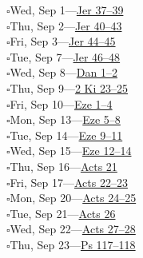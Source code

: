 \hypertarget{rp-2027-09-01}{}\noindent$\square$\enspace Wed, Sep 1\enspace---\enspace \hyperlink{ch-jeremiah-37}{Jer 37--39}\\
\hypertarget{rp-2027-09-02}{}\noindent$\square$\enspace Thu, Sep 2\enspace---\enspace \hyperlink{ch-jeremiah-40}{Jer 40--43}\\
\hypertarget{rp-2027-09-03}{}\noindent$\square$\enspace Fri, Sep 3\enspace---\enspace \hyperlink{ch-jeremiah-44}{Jer 44--45}\\
\hypertarget{rp-2027-09-07}{}\noindent$\square$\enspace Tue, Sep 7\enspace---\enspace \hyperlink{ch-jeremiah-46}{Jer 46--48}\\
\hypertarget{rp-2027-09-08}{}\noindent$\square$\enspace Wed, Sep 8\enspace---\enspace \hyperlink{ch-daniel-1}{Dan 1--2}\\
\hypertarget{rp-2027-09-09}{}\noindent$\square$\enspace Thu, Sep 9\enspace---\enspace \hyperlink{ch-2kings-23}{2 Ki 23--25}\\
\hypertarget{rp-2027-09-10}{}\noindent$\square$\enspace Fri, Sep 10\enspace---\enspace \hyperlink{ch-ezekiel-1}{Eze 1--4}\\
\hypertarget{rp-2027-09-13}{}\noindent$\square$\enspace Mon, Sep 13\enspace---\enspace \hyperlink{ch-ezekiel-5}{Eze 5--8}\\
\hypertarget{rp-2027-09-14}{}\noindent$\square$\enspace Tue, Sep 14\enspace---\enspace \hyperlink{ch-ezekiel-9}{Eze 9--11}\\
\hypertarget{rp-2027-09-15}{}\noindent$\square$\enspace Wed, Sep 15\enspace---\enspace \hyperlink{ch-ezekiel-12}{Eze 12--14}\\
\hypertarget{rp-2027-09-16}{}\noindent$\square$\enspace Thu, Sep 16\enspace---\enspace \hyperlink{ch-acts-21}{Acts 21}\\
\hypertarget{rp-2027-09-17}{}\noindent$\square$\enspace Fri, Sep 17\enspace---\enspace \hyperlink{ch-acts-22}{Acts 22--23}\\
\hypertarget{rp-2027-09-20}{}\noindent$\square$\enspace Mon, Sep 20\enspace---\enspace \hyperlink{ch-acts-24}{Acts 24--25}\\
\hypertarget{rp-2027-09-21}{}\noindent$\square$\enspace Tue, Sep 21\enspace---\enspace \hyperlink{ch-acts-26}{Acts 26}\\
\hypertarget{rp-2027-09-22}{}\noindent$\square$\enspace Wed, Sep 22\enspace---\enspace \hyperlink{ch-acts-27}{Acts 27--28}\\
\hypertarget{rp-2027-09-23}{}\noindent$\square$\enspace Thu, Sep 23\enspace---\enspace \hyperlink{ch-psalms-117}{Ps 117--118}\\
